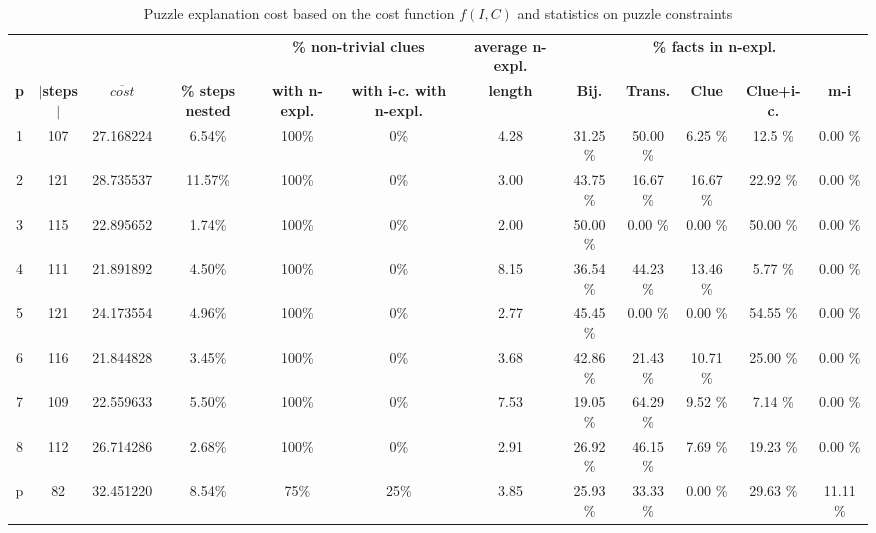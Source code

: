 	\begin{table}
		\centering
	\begin{tabular}{c|ccc|cc|c|ccccc}
		  &  		  &         &  & \multicolumn{2}{c|}{\textbf{\% non-trivial clues}} & \multicolumn{1}{c|}{\textbf{average n-expl.}}& \multicolumn{5}{c}{\textbf{\% facts in n-expl.}} \\
	\textbf{p} &  \textbf{$|$steps$|$} &  $\overline{cost}$ &\textbf{\% steps nested} & \textbf{with n-expl.} & \textbf{with i-c. with n-expl.}  			&   \textbf{length}  &  \textbf{Bij.} &   \textbf{Trans.} &  \textbf{Clue}  &  \textbf{Clue+i-c.} &  \textbf{m-i} \\\hline
		1 &      					107 & 27.168224   &       6.54\% &       100\% &        0\% &    4.28 &       31.25 \% &          50.00 \% &                6.25 \% &              12.5 \% &          0.00 \% \\
		2 &      					121 & 28.735537   &      11.57\% &       100\% &        0\% &    3.00 &       43.75 \% &         16.67 \% &               16.67 \% &             22.92 \% &         0.00 \% \\
		3 &      					115 & 22.895652   &       1.74\% &       100\% &        0\% &    2.00 &        50.00 \% &             0.00 \% &                  0.00 \% &              50.00 \% &           0.00 \% \\
		4 &      					111 & 21.891892   &        4.50\% &       100\% &        0\% &    8.15 &       36.54 \% &         44.23 \% &               13.46 \% &              5.77 \% &         0.00 \% \\
		5 &      					121 & 24.173554   &       4.96\% &       100\% &        0\% &    2.77 &       45.45 \% &             0.00 \% &                  0.00 \% &             54.55 \% &          0.00 \% \\
		6 &      					116 & 21.844828   &       3.45\% &       100\% &        0\% &    3.68 &       42.86 \% &         21.43 \% &               10.71 \% &              25.00 \% &         0.00 \% \\
		7 &      					109 & 22.559633   &        5.50\% &       100\% &        0\% &    7.53 &       19.05 \% &         64.29 \% &                9.52 \% &              7.14 \% &          0.00 \% \\
		8 &      					112 & 26.714286   &       2.68\% &      100\% &        0\% &    2.91 &       26.92 \% &         46.15 \% &                7.69 \% &             19.23 \% &           0.00 \% \\
		p &      					 82 & 32.451220   &       8.54\% &      75\% &     	25\% &       3.85 &       25.93 \% &         33.33 \% &                   0.00 \% &             29.63 \% &       11.11 \% 
		\end{tabular}
		\caption{Puzzle explanation cost based on the cost function $f(I, C)$ and statistics on puzzle constraints}
		\label{table:sequence_leve}
		\end{table}


	